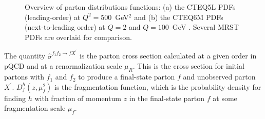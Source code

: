 \begin{figure}[p!]
 \centering
 \caption{Overview of parton distributions functions: (a) the CTEQ5L PDFs (leading-order) at $Q^{2}=500$~GeV$^{2}$ \cite{pap:CTEQ5LPDFs} and (b) the CTEQ6M PDFs (next-to-leading order) at $Q=2$ and $Q=100$~GeV \cite{pap:CTEQ6MPDFs}. Several MRST PDFs are overlaid for comparison.}
 \label{fig:PDFsDistributions}
\end{figure}

The quantity $\hat{\sigma}^{f_{1}f_{2}\to fX^{\prime}}$ is the parton cross section calculated at a given order in pQCD and at a renormalization scale $\mu_{R}$. This is the cross section for initial partons with $f_1$ and $f_2$ to produce a final-state parton $f$ and unobserved parton $X^{\prime}$. $D_{f}^{h}(z,\mu^{2}_{f})$ is the fragmentation function, which is the probability density for finding $h$ with fraction of momentum $z$ in the final-state parton $f$ at some fragmentation scale $\mu_f$.

